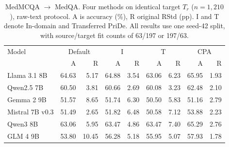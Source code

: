 \begin{table}[htbp]
\centering\small\setlength{\tabcolsep}{4pt}
\caption{MedMCQA $\rightarrow$ MedQA. Four methods on identical target $T_r$ ($n=1,210$), raw-text protocol. A is accuracy (\%), R original RStd (pp). I and T denote In-domain and Transferred PriDe. All results use one seed-42 split, with source/target fit counts of 63/197 or 197/63.}
\label{tab:transfer-medmcqa}
\begin{tabular}{lrrrrrrrr}
\toprule
Model & \multicolumn{2}{c}{Default} & \multicolumn{2}{c}{I} & \multicolumn{2}{c}{T} & \multicolumn{2}{c}{CPA}\\
 & A & R & A & R & A & R & A & R\\
\midrule
Llama 3.1 8B & 64.63 & 5.17 & 64.88 & 3.54 & 63.06 & 6.23 & 65.95 & 1.93\\
Qwen2.5 7B & 60.50 & 3.81 & 60.66 & 2.69 & 60.08 & 3.23 & 62.48 & 2.10\\
Gemma 2 9B & 51.57 & 8.65 & 51.74 & 6.30 & 50.50 & 5.83 & 51.16 & 2.79\\
Mistral 7B v0.3 & 51.49 & 2.65 & 51.82 & 6.48 & 50.58 & 7.12 & 53.88 & 2.23\\
Qwen3 8B & 63.06 & 5.95 & 63.47 & 4.86 & 63.47 & 7.40 & 65.29 & 2.76\\
GLM 4 9B & 53.80 & 10.45 & 56.28 & 5.18 & 55.95 & 5.07 & 57.93 & 1.78\\
\bottomrule
\end{tabular}
\end{table}
